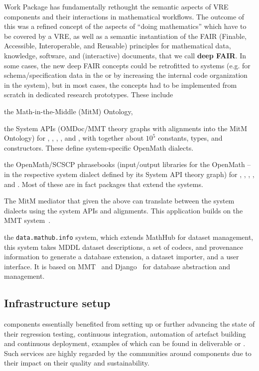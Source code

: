 \documentclass{deliverablereport}
\def\dmh{\texttt{data.mathub.info}\xspace}
\begin{document}
Work Package  has fundamentally rethought the semantic aspects of VRE components and their interactions in mathematical workflows.
The outcome of this was a refined concept of the aspects of ``doing mathematics'' which have to be covered by a VRE, as well as a semantic instantiation of the FAIR (Finable, Accessible, Interoperable, and Reusable) principles for mathematical data, knowledge, software, and (interactive) documents, that we call \textbf{deep FAIR}.
In some cases, the new deep FAIR concepts could be retrofitted to \pn systems (e.g. for schema/specification data in the \LMFDB or by increasing the internal code organization in the \GAP system), but in most cases, the concepts had to be implemented from scratch in dedicated research prototypes. These include
\begin{compactenum}
\item the Math-in-the-Middle (MitM) Ontology,
\item the System APIs (OMDoc/MMT theory graphs with alignments into the MitM Ontology) for \GAP, \Sage, \LMFDB, \Singular, and \PariGP, with together about $10^5$ constants, types, and constructors. These define system-specific OpenMath dialects.
\item the OpenMath/SCSCP phrasebooks (input/output libraries for the OpenMath -- in the respective system dialect defined by its System API theory graph) for \GAP, \Sage, \LMFDB, \Singular, and \PariGP. Most of these are in fact packages that extend the systems.
  \item The MitM mediator that  given the above can translate between the system dialects using the system APIs and alignments. This application builds on the MMT system~\cite{uniformal:on}.
  \item the \dmh system, which extends MathHub for dataset management, this system takes MDDL dataset descriptions, a set of codecs, and provenance information to generate a database extension, a dataset importer, and a user interface.  It is based on MMT~\cite{uniformal:on} and Django~\cite{django:on} for database abstraction and management.
  \end{compactenum}

\subsection{Infrastructure setup}

\ODK components essentially benefited from setting up or further
advancing the state of their regression testing, continuous
integration, automation of artefact building and continuous
deployment, examples of which can be found in deliverable
 or
.
Such services are highly regarded by the communities around
\ODK components due to their impact on their quality and
sustainability.
\end{document}
